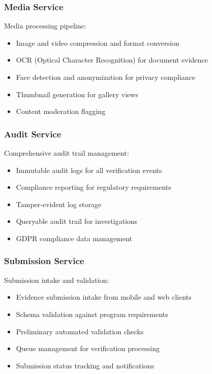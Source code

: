 \subsubsection{Media Service}

Media processing pipeline:
\begin{itemize}
  \item Image and video compression and format conversion
  \item OCR (Optical Character Recognition) for document evidence
  \item Face detection and anonymization for privacy compliance
  \item Thumbnail generation for gallery views
  \item Content moderation flagging
\end{itemize}

\subsubsection{Audit Service}

Comprehensive audit trail management:
\begin{itemize}
  \item Immutable audit logs for all verification events
  \item Compliance reporting for regulatory requirements
  \item Tamper-evident log storage
  \item Queryable audit trail for investigations
  \item GDPR compliance data management
\end{itemize}

\subsubsection{Submission Service}

Submission intake and validation:
\begin{itemize}
  \item Evidence submission intake from mobile and web clients
  \item Schema validation against program requirements
  \item Preliminary automated validation checks
  \item Queue management for verification processing
  \item Submission status tracking and notifications
\end{itemize}

